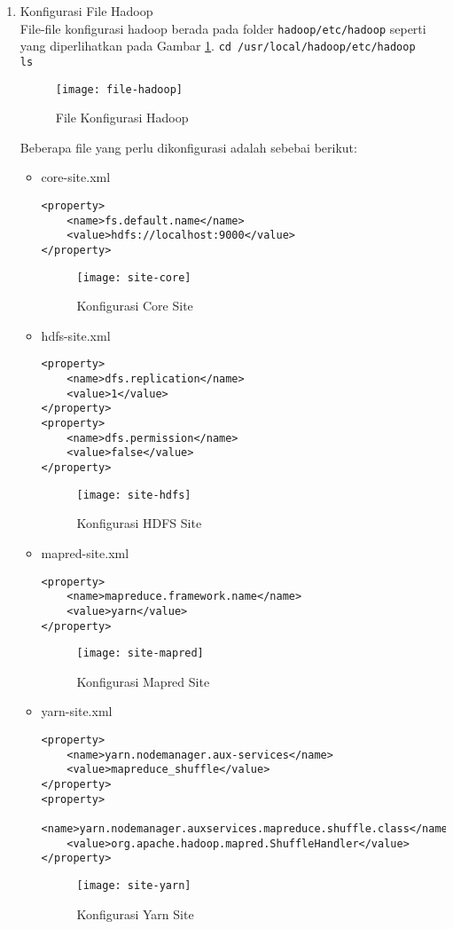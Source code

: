 \documentclass[a4paper]{tufte-handout}
\begin{document}
\begin{enumerate}
\item Konfigurasi File Hadoop \\
File-file konfigurasi hadoop berada pada folder {\tt hadoop/etc/hadoop} seperti yang diperlihatkan pada Gambar \ref{gam:file-hadoop}.
{\tt cd /usr/local/hadoop/etc/hadoop} \\
{\tt ls}
\begin{figure}[!ht]
\texttt{[image: file-hadoop]}
\caption{File Konfigurasi Hadoop}
\label{gam:file-hadoop}
\end{figure}

Beberapa file yang perlu dikonfigurasi adalah sebebai berikut:
\begin{itemize}

\item core-site.xml
\begin{lstlisting}
<property>
	<name>fs.default.name</name>
	<value>hdfs://localhost:9000</value>
</property>
\end{lstlisting}
\begin{figure}[!ht]
\centering
\texttt{[image: site-core]}
\caption{Konfigurasi Core Site}
\label{gam:site-yarn}
\end{figure}

\item hdfs-site.xml
\begin{lstlisting}
<property>
	<name>dfs.replication</name>
	<value>1</value>
</property>
<property>
	<name>dfs.permission</name>
	<value>false</value>
</property>
\end{lstlisting}
\begin{figure}[!ht]
\centering
\texttt{[image: site-hdfs]}
\caption{Konfigurasi HDFS Site}
\label{gam:site-yarn}
\end{figure}

\item mapred-site.xml
\begin{lstlisting}
<property>
	<name>mapreduce.framework.name</name>
	<value>yarn</value>
</property>
\end{lstlisting}
\begin{figure}[!ht]
\texttt{[image: site-mapred]}
\caption{Konfigurasi Mapred Site}
\label{gam:site-yarn}
\end{figure}

\item yarn-site.xml
\begin{lstlisting}
<property>
	<name>yarn.nodemanager.aux-services</name>
	<value>mapreduce_shuffle</value>
</property>
<property>
	<name>yarn.nodemanager.auxservices.mapreduce.shuffle.class</name>
	<value>org.apache.hadoop.mapred.ShuffleHandler</value>
</property>
\end{lstlisting}
\begin{figure}[!ht]
\texttt{[image: site-yarn]}
\caption{Konfigurasi Yarn Site}
\label{gam:site-yarn}
\end{figure}
\end{itemize}


\end{enumerate}
\end{document}
